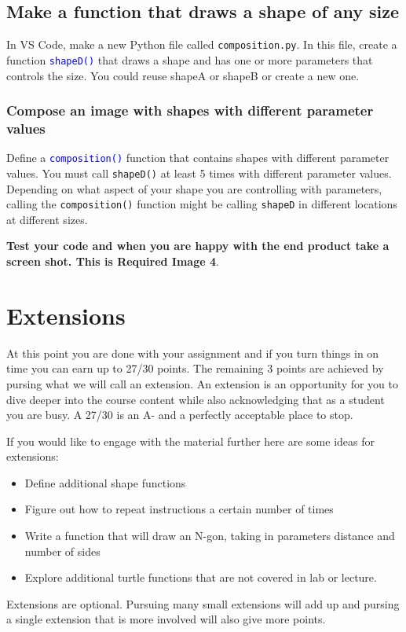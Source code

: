 \documentclass[12pt]{article}
\begin{document}
\subsection{Make a function that draws a shape of any size}
In VS Code, make a new Python file called \texttt{composition.py}.
In this file, create a function \texttt{\textcolor{blue}{shapeD()}} that draws a shape and has one or more parameters that controls the size.
You could reuse shapeA or shapeB or create a new one.

\subsubsection{Compose an image with shapes with different parameter values}
Define a \texttt{\textcolor{blue}{composition()}} function that contains shapes with different parameter values.
You must call \texttt{shapeD()} at least 5 times with different parameter values.
Depending on what aspect of your shape you are controlling with parameters, calling the \texttt{composition()} function might be calling \texttt{shapeD} in different locations at different sizes.

\textbf{Test your code and when you are happy with the end product take a screen shot. This is Required Image 4}.


\section{Extensions}
At this point you are done with your assignment and if you turn things in on time you can earn up to 27/30 points.
The remaining 3 points are achieved by pursing what we will call an extension.
An extension is an opportunity for you to dive deeper into the course content while also acknowledging that as a student you are busy.
A 27/30 is an A- and a perfectly acceptable place to stop.

If you would like to engage with the material further here are some ideas for extensions:
\begin{itemize}
\item Define additional shape functions
\item Figure out how to repeat instructions a certain number of times
\item Write a function that will draw an N-gon, taking in parameters distance and number of sides
  \item Explore additional turtle functions that are not covered in lab or lecture. 
\end{itemize}
Extensions are optional. Pursuing many small extensions will add up and pursing a single extension that is more involved will also give more points.
\end{document}
